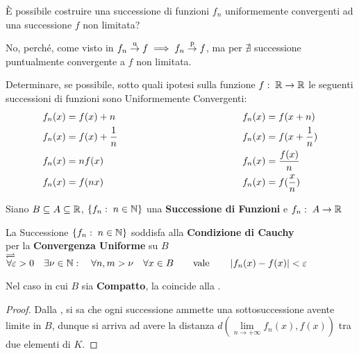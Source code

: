 \begin{exercise}
	È possibile costruire una successione di funzioni $f_n$ uniformemente convergenti ad una successione $f$ non limitata?
	\begin{solution}
		No, perché, come visto in  $f_n \overset{\text{u}}{\to} f \implies f_n \overset{\text{p}}{\to} f$, ma per  $\nexists$ successione puntualmente convergente a $f$ non limitata.
	\end{solution}
\end{exercise}
\begin{exercise}
	Determinare, se possibile, sotto quali ipotesi sulla funzione $f:\; \mathbb{R} \to \mathbb{R}$ le seguenti successioni di funzioni sono Uniformemente Convergenti:
	\begin{alignat*}{2}
		f_n(x) &= f(x) + n \hspace*{.35\linewidth} & f_n(x) &= f(x + n)\\
		f_n(x) &= f(x) + \frac{1}{n} & f_n(x) &= f(x + \frac{1}{n})\\
		f_n(x) &= nf(x) & f_n(x) &= \frac{f(x)}{n}\\
		f_n(x) &= f(nx) & f_n(x) &= f(\frac{x}{n})
	\end{alignat*}
\end{exercise}
\begin{definition}
	\label{def:succ_funz_cau}
	Siano $B \subseteq A \subseteq \mathbb{R}$, $\left\{f_n:\; n \in \mathbb{N}\right\}$ una \textbf{Successione di Funzioni} e $f_n:\; A \to \mathbb{R}$
	\begin{center}
		La Successione $\left\{f_n:\; n \in \mathbb{N}\right\}$ soddisfa alla \textbf{Condizione di Cauchy}\\
		per la \textbf{Convergenza Uniforme} su $B$\\
		$\rightleftharpoons$\\
		$
			\forall \varepsilon > 0 \quad \exists \nu \in \N: \quad \forall n, m > \nu \quad \forall x \in B %
			\qquad \text{vale} \qquad \abs{f_n(x) - f(x)} < \varepsilon
		$
	\end{center}
\end{definition}
\begin{proposition}
	\label{prop:in_compat_succ_funz_cau_corrisp_a_succ_cau}
	Nel caso in cui $B$ sia \textbf{Compatto}, la  coincide alla .
	\begin{proof}
		Dalla , si sa che ogni successione ammette una sottosuccessione avente limite in $B$, dunque si arriva ad avere la distanza $d \left( \lim\limits_{n \to +\infty}f_n(x), f(x) \right)$ tra due elementi di $K$.
	\end{proof}
\end{proposition}
